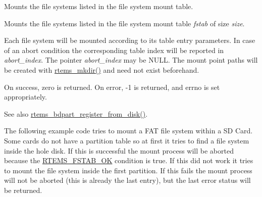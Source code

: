 Mounts the file systems listed in the file system mount table. 

Mounts the file systems listed in the file system mount table {\itshape fstab} of size {\itshape size}.

Each file system will be mounted according to its table entry parameters. In case of an abort condition the corresponding table index will be reported in {\itshape abort\+\_\+index}. The pointer {\itshape abort\+\_\+index} may be {\ttfamily N\+U\+LL}. The mount point paths will be created with \mbox{\hyperlink{group__LibIO_gad15bb6c81ba9ed35ec75103d13bde734}{rtems\+\_\+mkdir()}} and need not exist beforehand.

On success, zero is returned. On error, -\/1 is returned, and {\ttfamily errno} is set appropriately.

\begin{DoxySeeAlso}{See also}
\mbox{\hyperlink{group__rtems__bdpart_ga9b0517982a75560e134c808e70885b81}{rtems\+\_\+bdpart\+\_\+register\+\_\+from\+\_\+disk()}}.
\end{DoxySeeAlso}
The following example code tries to mount a F\+AT file system within a SD Card. Some cards do not have a partition table so at first it tries to find a file system inside the hole disk. If this is successful the mount process will be aborted because the \mbox{\hyperlink{group__rtems__fstab_ggabcbeff39e673bbef9ec0960f64d19228a599040e2f9b9138f579b4afe2d89e74f}{R\+T\+E\+M\+S\+\_\+\+F\+S\+T\+A\+B\+\_\+\+OK}} condition is true. If this did not work it tries to mount the file system inside the first partition. If this fails the mount process will not be aborted (this is already the last entry), but the last error status will be returned.


